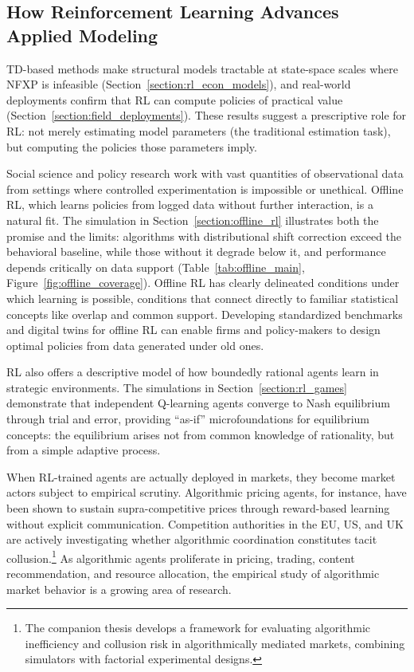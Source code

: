 \subsection{How Reinforcement Learning Advances Applied Modeling}

TD-based methods make structural models tractable at state-space scales where NFXP is infeasible (Section~\ref{section:rl_econ_models}), and real-world deployments confirm that RL can compute policies of practical value (Section~\ref{section:field_deployments}). These results suggest a prescriptive role for RL: not merely estimating model parameters (the traditional estimation task), but computing the policies those parameters imply.

Social science and policy research work with vast quantities of observational data from settings where controlled experimentation is impossible or unethical. Offline RL, which learns policies from logged data without further interaction, is a natural fit. The simulation in Section~\ref{section:offline_rl} illustrates both the promise and the limits: algorithms with distributional shift correction exceed the behavioral baseline, while those without it degrade below it, and performance depends critically on data support (Table~\ref{tab:offline_main}, Figure~\ref{fig:offline_coverage}). Offline RL has clearly delineated conditions under which learning is possible, conditions that connect directly to familiar statistical concepts like overlap and common support. Developing standardized benchmarks and digital twins for offline RL can enable firms and policy-makers to design optimal policies from data generated under old ones.

RL also offers a descriptive model of how boundedly rational agents learn in strategic environments. The simulations in Section~\ref{section:rl_games} demonstrate that independent Q-learning agents converge to Nash equilibrium through trial and error, providing ``as-if'' microfoundations for equilibrium concepts: the equilibrium arises not from common knowledge of rationality, but from a simple adaptive process.

When RL-trained agents are actually deployed in markets, they become market actors subject to empirical scrutiny. Algorithmic pricing agents, for instance, have been shown to sustain supra-competitive prices through reward-based learning without explicit communication. Competition authorities in the EU, US, and UK are actively investigating whether algorithmic coordination constitutes tacit collusion.\footnote{The companion thesis \citep{Rawat2026collusion} develops a framework for evaluating algorithmic inefficiency and collusion risk in algorithmically mediated markets, combining simulators with factorial experimental designs.} As algorithmic agents proliferate in pricing, trading, content recommendation, and resource allocation, the empirical study of algorithmic market behavior is a growing area of research. 

